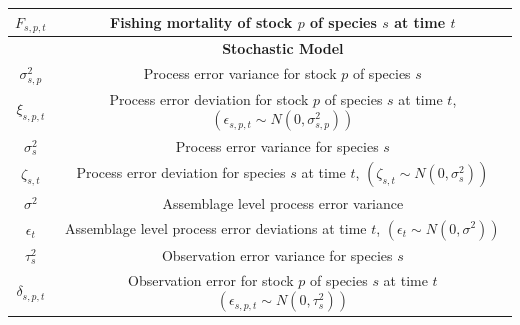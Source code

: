 \documentclass[]{scrartcl}
\begin{document}
\begin{table}[htbp]
\begin{center}
\begin{tabular}{c|c}
$F_{s,p,t}$ & Fishing mortality of stock $p$ of species $s$ at time $t$ \\
\hline
& \textbf{ Stochastic Model } \\
$\sigma_{s,p}^2$ & Process error variance for stock $p$ of species $s$ \\
$\xi_{s,p,t}$ & Process error deviation for stock $p$ of species $s$ at time $t$, $\left( \epsilon_{s,p,t} \sim N (0, \sigma_{s,p}^2) \right)$ \\
$\sigma_{s}^2$ & Process error variance for species $s$ \\
$\zeta_{s,t}$ & Process error deviation for species $s$ at time $t$, $\left( \zeta_{s,t} \sim N (0, \sigma_s^2) \right)$ \\
$\sigma^2$ & Assemblage level process error variance  \\
$\epsilon_{t}$ & Assemblage level process error deviations at time $t$, $\left( \epsilon_{t} \sim N (0, \sigma^2) \right)$ \\
$\tau_s^2$ & Observation error variance for species $s$ \\
$\delta_{s,p,t}$ & Observation error for stock $p$ of species $s$ at time $t$ $\left(\epsilon_{s,p,t} \sim N (0, \tau_s^2) \right)$ \\
\hline
\end{tabular}
\end{center}
\end{table}

\newpage
\end{document}
